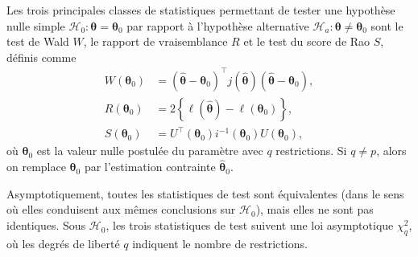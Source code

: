 \documentclass[
  11pt,
  letterpaper,
]{scrbook}
\theoremstyle{definition}
\theoremstyle{plain}
\theoremstyle{definition}
\theoremstyle{plain}
\theoremstyle{remark}
\begin{document}
Les trois principales classes de statistiques permettant de tester une
hypothèse nulle simple
\(\mathscr{H}_0 : \boldsymbol{\theta}=\boldsymbol{\theta}_0\) par
rapport à l'hypothèse alternative
\(\mathscr{H}_a : \boldsymbol{\theta} \neq \boldsymbol{\theta}_0\) sont
le test de Wald \(W\), le rapport de vraisemblance \(R\) et le test du
score de Rao \(S\), définis comme \begin{align*}
 W(\boldsymbol{\theta}_0) &= (\widehat{\boldsymbol{\theta}}-\boldsymbol{\theta}_0)^\top j(\widehat{\boldsymbol{\theta}})(\widehat{\boldsymbol{\theta}}-\boldsymbol{\theta}_0), \\
 R(\boldsymbol{\theta}_0) &= 2 \left\{ \ell(\widehat{\boldsymbol{\theta}})-\ell(\boldsymbol{\theta}_0)\right\},\\
 S(\boldsymbol{\theta}_0) &= U^\top(\boldsymbol{\theta}_0)i^{-1}(\boldsymbol{\theta}_0)U(\boldsymbol{\theta}_0), 
\end{align*} où \(\boldsymbol{\theta}_0\) est la valeur nulle postulée
du paramètre avec \(q\) restrictions. Si \(q \neq p\), alors on remplace
\(\boldsymbol{\theta}_0\) par l'estimation contrainte
\(\widehat{\boldsymbol{\theta}}_0\).

Asymptotiquement, toutes les statistiques de test sont équivalentes
(dans le sens où elles conduisent aux mêmes conclusions sur
\(\mathscr{H}_0\)), mais elles ne sont pas identiques. Sous
\(\mathscr{H}_0\), les trois statistiques de test suivent une loi
asymptotique \(\chi^2_q\), où les degrés de liberté \(q\) indiquent le
nombre de restrictions.
\end{document}
